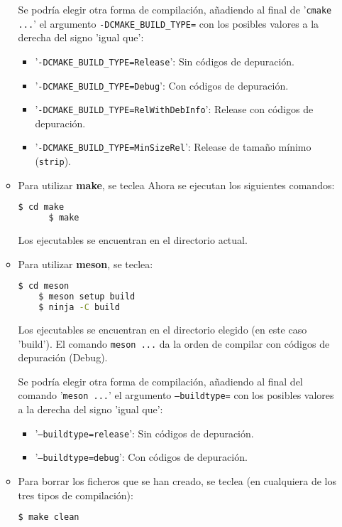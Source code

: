 \begin{enumerate}
\begin{itemize}
    Se podría elegir otra forma de compilación, añadiendo al final de '\texttt{cmake ...}'
    el argumento \texttt{-DCMAKE\_BUILD\_TYPE=} con los posibles valores a la derecha del signo 'igual que':
    \begin{itemize}
      \tightlist
    \item '\texttt{-DCMAKE\_BUILD\_TYPE=Release}': Sin códigos de depuración.
    \item '\texttt{-DCMAKE\_BUILD\_TYPE=Debug}': Con códigos de depuración.
    \item '\texttt{-DCMAKE\_BUILD\_TYPE=RelWithDebInfo}': Release con códigos de depuración.
    \item '\texttt{-DCMAKE\_BUILD\_TYPE=MinSizeRel}': Release de tamaño mínimo (\texttt{strip}).
    \end{itemize}
  \item Para utilizar \textbf{make}, se teclea
    Ahora se ejecutan los siguientes comandos:
    \begin{lstlisting}[language=bash]
      $ cd make
      $ make
    \end{lstlisting}
    Los ejecutables se encuentran en el directorio actual.
  \item Para utilizar \textbf{meson}, se teclea:
    \begin{lstlisting}[language=bash]
    $ cd meson
    $ meson setup build
    $ ninja -C build
  \end{lstlisting}
  Los ejecutables se encuentran en el directorio elegido (en este caso 'build').
  El comando \texttt{meson ...} da la orden de compilar con códigos de depuración (\textsf{Debug}).

  Se podría elegir otra forma de compilación, añadiendo al final del comando '\texttt{meson ...}'
  el argumento \texttt{--buildtype=} con los posibles valores a la derecha del signo 'igual que':
  \begin{itemize}
    \tightlist
  \item '\texttt{--buildtype=release}': Sin códigos de depuración.
  \item '\texttt{--buildtype=debug}': Con códigos de depuración.
  \end{itemize}

\item Para borrar los ficheros que se han creado, se teclea (en cualquiera de los tres tipos de compilación):
  \begin{lstlisting}[language=bash]
    $ make clean
  \end{lstlisting}
  \end{itemize}
\end{enumerate}






